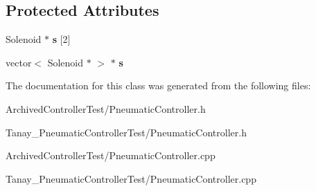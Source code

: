 \subsection*{Protected Attributes}
\begin{DoxyCompactItemize}
\item 
\hypertarget{class_pneumatic_controller_a1848c7ad0fe86fee27f407f14300ea1d}{Solenoid $\ast$ {\bfseries s} \mbox{[}2\mbox{]}}\label{class_pneumatic_controller_a1848c7ad0fe86fee27f407f14300ea1d}

\item 
\hypertarget{class_pneumatic_controller_aaf5da98ab6220bc3830e4f098392d725}{vector$<$ Solenoid $\ast$ $>$ $\ast$ {\bfseries s}}\label{class_pneumatic_controller_aaf5da98ab6220bc3830e4f098392d725}

\end{DoxyCompactItemize}


The documentation for this class was generated from the following files\-:\begin{DoxyCompactItemize}
\item 
Archived\-Controller\-Test/Pneumatic\-Controller.\-h\item 
Tanay\-\_\-\-Pneumatic\-Controller\-Test/Pneumatic\-Controller.\-h\item 
Archived\-Controller\-Test/Pneumatic\-Controller.\-cpp\item 
Tanay\-\_\-\-Pneumatic\-Controller\-Test/Pneumatic\-Controller.\-cpp\end{DoxyCompactItemize}
